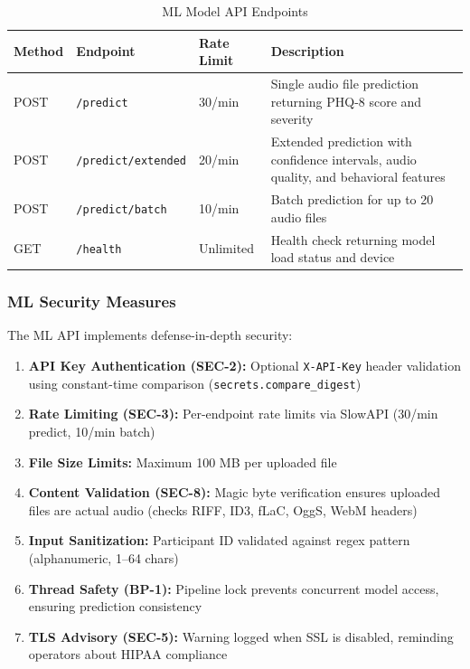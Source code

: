 \documentclass[12pt]{article}
\begin{document}
	\begin{table}[H]
		\centering
		\caption{ML Model API Endpoints}
		\small
		\begin{tabular}{|l|l|l|p{5cm}|}
			\hline
			\textbf{Method} & \textbf{Endpoint} & \textbf{Rate Limit} & \textbf{Description} \\ \hline
			POST & \texttt{/predict} & 30/min & Single audio file prediction returning PHQ-8 score and severity \\ \hline
			POST & \texttt{/predict/extended} & 20/min & Extended prediction with confidence intervals, audio quality, and behavioral features \\ \hline
			POST & \texttt{/predict/batch} & 10/min & Batch prediction for up to 20 audio files \\ \hline
			GET & \texttt{/health} & Unlimited & Health check returning model load status and device \\ \hline
		\end{tabular}
	\end{table}

	\subsubsection{ML Security Measures}

	The ML API implements defense-in-depth security:

	\begin{enumerate}
		\item \textbf{API Key Authentication (SEC-2):} Optional \texttt{X-API-Key} header validation using constant-time comparison (\texttt{secrets.compare\_digest})
		\item \textbf{Rate Limiting (SEC-3):} Per-endpoint rate limits via SlowAPI (30/min predict, 10/min batch)
		\item \textbf{File Size Limits:} Maximum 100 MB per uploaded file
		\item \textbf{Content Validation (SEC-8):} Magic byte verification ensures uploaded files are actual audio (checks RIFF, ID3, fLaC, OggS, WebM headers)
		\item \textbf{Input Sanitization:} Participant ID validated against regex pattern (alphanumeric, 1--64 chars)
		\item \textbf{Thread Safety (BP-1):} Pipeline lock prevents concurrent model access, ensuring prediction consistency
		\item \textbf{TLS Advisory (SEC-5):} Warning logged when SSL is disabled, reminding operators about HIPAA compliance
	\end{enumerate}
\end{document}
